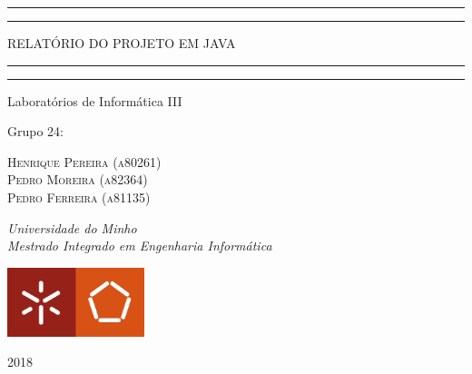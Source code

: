 \documentclass[a4paper, 11pt, oneside]{article}
\begin{document}
 

\begin{titlepage}


	\centering 
	
	\scshape
	
	\vspace*{\baselineskip}
	
	
	\rule{\textwidth}{1.6pt}\vspace*{-\baselineskip}\vspace*{2pt}
	\rule{\textwidth}{0.4pt}
	
	\vspace{0.75\baselineskip}
	
	{\LARGE RELATÓRIO DO PROJETO EM JAVA} 
	
	\vspace{0.75\baselineskip} 
	
	\rule{\textwidth}{0.4pt}\vspace*{-\baselineskip}\vspace{3.2pt}
	\rule{\textwidth}{1.6pt}
	
	\vspace{2\baselineskip}
	
	Laboratórios de Informática III
	
	\vspace*{3\baselineskip}
	
	Grupo 24:
	
	\vspace{0.5\baselineskip}
	
	{\scshape\Large Henrique Pereira (a80261) \\ Pedro Moreira (a82364) \\ Pedro Ferreira (a81135) \\}
	
	\vspace{0.5\baselineskip}
	
	\textit{Universidade do Minho \\ Mestrado Integrado em Engenharia Informática}
	
	\vfill

	\includegraphics[width=40mm]{logoUM.jpg}

	\vspace{0.3\baselineskip}
	
	2018

\end{titlepage}
\end{document}
